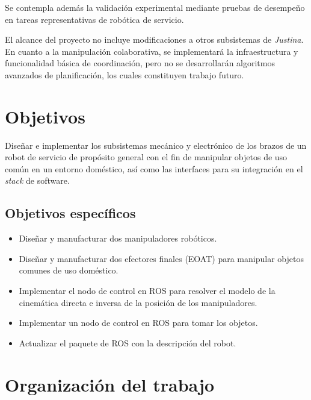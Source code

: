 Se contempla además la validación experimental mediante pruebas de desempeño en tareas representativas de robótica de servicio.

El alcance del proyecto no incluye modificaciones a otros subsistemas de \emph{Justina}. En cuanto a la manipulación colaborativa, se implementará la infraestructura y funcionalidad básica de coordinación, pero no se desarrollarán algoritmos avanzados de planificación, los cuales constituyen trabajo futuro.

\section{Objetivos}

Diseñar e implementar los subsistemas mecánico y electr\'onico de los brazos de un robot de servicio de prop\'osito general con el fin de manipular objetos de uso com\'un en un entorno dom\'estico, así como las interfaces para su integraci\'on en el \emph{stack} de software.

\subsection{Objetivos espec\'ificos}

\begin{itemize}
    \item Diseñar y manufacturar dos manipuladores rob\'oticos.
    \item Diseñar y manufacturar dos efectores finales (EOAT) para manipular objetos comunes de uso doméstico.
    \item Implementar el nodo de control en ROS para resolver el modelo de la cinem\'atica directa e inversa de la posición de los manipuladores.
    \item Implementar un nodo de control en ROS para tomar los objetos.
    \item Actualizar el paquete de ROS con la descripci\'on del robot.
\end{itemize}

\section{Organización del trabajo}